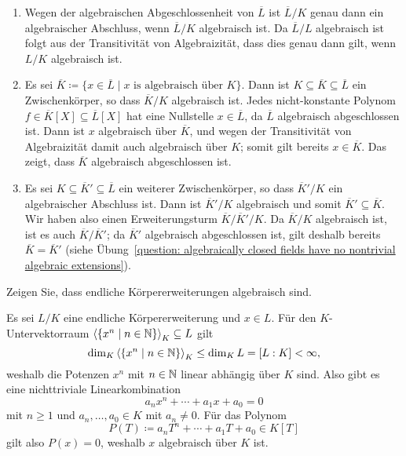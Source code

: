 \begin{solution}
  \begin{enumerate}
    \item
      Wegen der algebraischen Abgeschlossenheit von $\overline{L}$ ist $\overline{L}/K$ genau dann ein algebraischer Abschluss, wenn $\overline{L}/K$ algebraisch ist.
      Da $\overline{L}/L$ algebraisch ist folgt aus der Transitivität von Algebraizität, dass dies genau dann gilt, wenn $L/K$ algebraisch ist.
      
    \item
      Es sei $\overline{K} \coloneqq \{x \in \overline{L} \mid \text{$x$ is algebraisch über $K$}\}$.
      Dann ist $K \subseteq \overline{K} \subseteq \overline{L}$ ein Zwischenkörper, so dass $\overline{K}/K$ algebraisch ist.
      Jedes nicht-konstante Polynom $f \in \overline{K}[X] \subseteq \overline{L}[X]$ hat eine Nullstelle $x \in \overline{L}$, da $\overline{L}$ algebraisch abgeschlossen ist.
      Dann ist $x$ algebraisch über $\overline{K}$, und wegen der Transitivität von Algebraizität damit auch algebraisch über $K$;
      somit gilt bereits $x \in \overline{K}$.
      Das zeigt, dass $\overline{K}$ algebraisch abgeschlossen ist.
      
    \item
      Es sei $K \subseteq \overline{K}' \subseteq \overline{L}$ ein weiterer Zwischenkörper, so dass $\overline{K}'/K$ ein algebraischer Abschluss ist.
      Dann ist $\overline{K}'/K$ algebraisch und somit $\overline{K}' \subseteq \overline{K}$.
      Wir haben also einen Erweiterungsturm $\overline{K}/\overline{K}'/K$.
      Da $\overline{K}/K$ algebraisch ist, ist es auch $\overline{K}/\overline{K}'$;
      da $\overline{K}'$ algebraisch abgeschlossen ist, gilt deshalb bereits $\overline{K} = \overline{K}'$ (siehe Übung~\ref{question: algebraically closed fields have no nontrivial algebraic extensions}).
  \end{enumerate}
\end{solution}


\begin{question}
  \label{equation: finite extensions are algebraic}
  Zeigen Sie, dass endliche Körpererweiterungen algebraisch sind.
\end{question}


\begin{solution}
  Es sei $L/K$ eine endliche Körpererweiterung und $x \in L$.
  Für den $K$-Untervektorraum $\left\langle  \{x^n \mid n \in \mathbb{N}\}  \right\rangle_K \subseteq L$ gilt
  \[
          \dim_K \left\langle  \{x^n \mid n \in \mathbb{N} \}  \right\rangle_K
    \leq  \dim_K L
    =     [L : K]
    <     \infty,
  \]
  weshalb die Potenzen $x^n$ mit $n \in \mathbb{N}$ linear abhängig über $K$ sind.
  Also gibt es eine nichttriviale Linearkombination
  \[
    a_n x^n + \dotsb + a_1 x + a_0 = 0
  \]
  mit $n \geq 1$ und $a_n, \dotsc, a_0 \in K$ mit $a_n \neq 0$.
  Für das Polynom
  \[
              P(T)
    \coloneqq a_n T^n + \dotsb + a_1 T + a_0
    \in       K[T]
  \]
  gilt also $P(x) = 0$, weshalb $x$ algebraisch über $K$ ist.
\end{solution}


